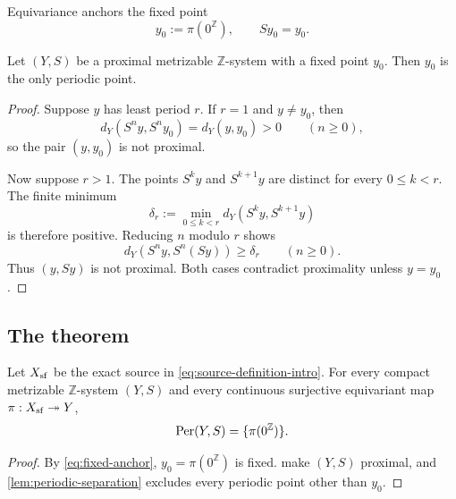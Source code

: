 Equivariance anchors the fixed point
\begin{equation}
  y_0:=\pi(0^{\mathbb Z}),
  \qquad Sy_0=y_0.
  \label{eq:fixed-anchor}
\end{equation}

\begin{lemma}
\label{lem:periodic-separation}
Let \((Y,S)\) be a proximal metrizable \(\mathbb Z\)-system with a fixed
point \(y_0\).  Then \(y_0\) is the only periodic point.
\end{lemma}

\begin{proof}
Suppose \(y\) has least period \(r\).  If \(r=1\) and \(y\neq y_0\), then
\[
  d_Y(S^n y,S^n y_0)=d_Y(y,y_0)>0
  \qquad(n\geq0),
\]
so the pair \((y,y_0)\) is not proximal.

Now suppose \(r>1\).  The points \(S^k y\) and \(S^{k+1}y\) are distinct
for every \(0\leq k<r\).  The finite minimum
\begin{equation}
  \delta_r:=\min_{0\leq k<r}
  d_Y(S^k y,S^{k+1}y)
  \label{eq:periodic-gap}
\end{equation}
is therefore positive.  Reducing \(n\) modulo \(r\) shows
\[
  d_Y(S^n y,S^n(Sy))\geq\delta_r
  \qquad(n\geq0).
\]
Thus \((y,Sy)\) is not proximal.  Both cases contradict proximality unless
\(y=y_0\).
\end{proof}



\subsection{The theorem}

\begin{theorem}
\label{thm:factor-rigidity}
Let \(X_{\mathrm{sf}}\) be the exact source in
\cref{eq:source-definition-intro}.  For every compact metrizable
\(\mathbb Z\)-system \((Y,S)\) and every continuous surjective equivariant
map \(\pi:X_{\mathrm{sf}}\twoheadrightarrow Y\),
\[
  \operatorname{Per}(Y,S)=\{\pi(0^{\mathbb Z})\}.
\]
\end{theorem}

\begin{proof}
By \cref{eq:fixed-anchor}, \(y_0=\pi(0^{\mathbb Z})\) is fixed.
 make \((Y,S)\) proximal, and
\cref{lem:periodic-separation} excludes every periodic point other than
\(y_0\).
\end{proof}

